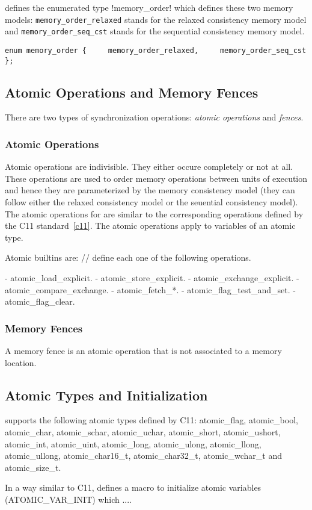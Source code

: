 \pencil defines the enumerated type \lstlisting!memory_order!
which defines these two memory models:
\lstinline!memory_order_relaxed! stands for the relaxed consistency memory
model and \lstinline!memory_order_seq_cst! stands for the sequential
consistency memory model.

\lstinline!enum memory_order {
    memory_order_relaxed,
    memory_order_seq_cst
};!

\subsection{Atomic Operations and Memory Fences}

There are two types of synchronization operations: \emph{atomic operations} and
\emph{fences}.

\subsubsection{Atomic Operations}
Atomic operations are indivisible. They either occure completely or not at all.
These operations are used to order memory operations between units of execution
and hence they are parameterized by the \pencil memory consistency model
(they can follow either the relaxed consistency model or the seuential
consistency model).
The atomic operations for \pencil are similar to the corresponding operations
defined by the C11 standard~\ref{c11}.
The \pencil atomic operations apply to variables of an atomic type.

Atomic builtins are:
// define each one of the following operations.

- atomic_load_explicit.
- atomic_store_explicit.
- atomic_exchange_explicit.
- atomic_compare_exchange.
- atomic_fetch_*.
- atomic_flag_test_and_set.
- atomic_flag_clear.


\subsubsection{Memory Fences}
A memory fence is an atomic operation that is not associated to a memory
location.


\subsection{Atomic Types and Initialization}
\pencil supports the following atomic types defined by C11: atomic_flag,
atomic_bool, atomic_char, atomic_schar, atomic_uchar, atomic_short,
atomic_ushort, atomic_int, atomic_uint, atomic_long, atomic_ulong, atomic_llong,
atomic_ullong, atomic_char16_t, atomic_char32_t, atomic_wchar_t and
atomic_size_t.

In a way similar to C11, \pencil defines a macro to initialize atomic variables
(ATOMIC_VAR_INIT) which ....

